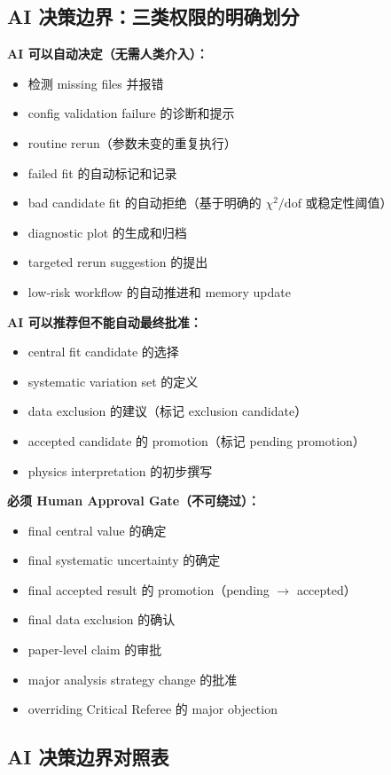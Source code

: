 \documentclass[11pt,a4paper,fontset=fandol]{ctexart}
\begin{document}
\subsection{AI 决策边界：三类权限的明确划分}

\textbf{AI 可以自动决定（无需人类介入）：}
\begin{itemize}
  \item 检测 missing files 并报错
  \item config validation failure 的诊断和提示
  \item routine rerun（参数未变的重复执行）
  \item failed fit 的自动标记和记录
  \item bad candidate fit 的自动拒绝（基于明确的 $\chi^2/\mathrm{dof}$ 或稳定性阈值）
  \item diagnostic plot 的生成和归档
  \item targeted rerun suggestion 的提出
  \item low-risk workflow 的自动推进和 memory update
\end{itemize}

\textbf{AI 可以推荐但不能自动最终批准：}
\begin{itemize}
  \item central fit candidate 的选择
  \item systematic variation set 的定义
  \item data exclusion 的建议（标记 exclusion candidate）
  \item accepted candidate 的 promotion（标记 pending promotion）
  \item physics interpretation 的初步撰写
\end{itemize}

\textbf{必须 Human Approval Gate（不可绕过）：}
\begin{itemize}
  \item final central value 的确定
  \item final systematic uncertainty 的确定
  \item final accepted result 的 promotion（pending $\to$ accepted）
  \item final data exclusion 的确认
  \item paper-level claim 的审批
  \item major analysis strategy change 的批准
  \item overriding Critical Referee 的 major objection
\end{itemize}

\subsection{AI 决策边界对照表}
\end{document}
